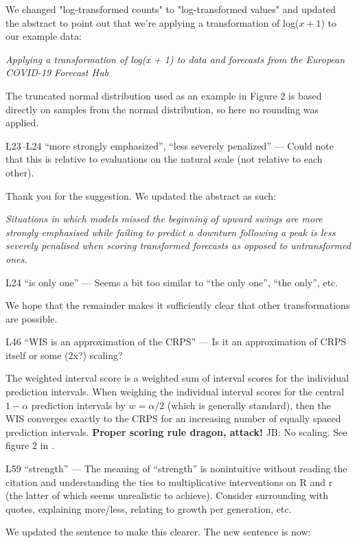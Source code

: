 \documentclass{article}
\newcommand{\black}{\color{black}}
\newcommand{\blue}{\color{blue}}
\begin{document}
\black
We changed "log-transformed counts" to "log-transformed values" and updated the abstract to point out that we're applying a transformation of log($x + 1$) to our example data: 

\textit{Applying a transformation of log(x + 1) to data and forecasts from the European COVID-19 Forecast Hub}

The truncated normal distribution used as an example in Figure 2 is based directly on samples from the normal distribution, so here no rounding was applied. 

\blue
L23–L24 “more strongly emphasized”, “less severely penalized” — Could note that this is relative to evaluations on the natural scale (not relative to each other).

\black
Thank you for the suggestion. We updated the abstract as such: 

\textit{Situations in which models missed the beginning of upward swings are more strongly emphasised while failing to predict a downturn following a peak is less severely penalised when scoring transformed forecasts as opposed to untransformed ones.}

\blue
L24 “is only one” — Seems a bit too similar to “the only one”, “the only”, etc.

\black
We hope that the remainder makes it sufficiently clear that other transformations are possible. 

\blue
L46 “WIS is an approximation of the CRPS” — Is it an approximation of CRPS itself or some (2x?) scaling?

\black
The weighted interval score is a weighted sum of interval scores for the individual prediction intervals. When weighing the individual interval scores for the central $1 - \alpha$ prediction intervals by 
$w = \alpha / 2$ (which is generally standard), then the WIS converges exactly to the CRPS for an increasing number of equally spaced prediction intervals. 
\textbf{Proper scoring rule dragon, attack!} JB: No scaling. See figure 2 in \cite{bracherEvaluatingEpidemicForecasts2021}.

\blue
L59 “strength” — The meaning of “strength” is nonintuitive without reading the citation and understanding the ties to multiplicative interventions on R and r (the latter of which seems unrealistic to achieve). Consider surrounding with quotes, explaining more/less, relating to growth per generation, etc.

\black
We updated the sentence to make this clearer. The new sentence is now: 
\end{document}

